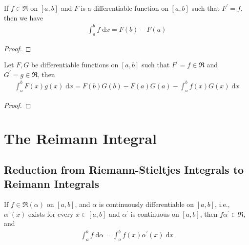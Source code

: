 \documentclass[thmcnt=section, 12pt]{elegantbook}
\begin{document}

\begin{theorem} \label{thm:1}
    If $ f \in \mathfrak{R} $ on $[a, b]$ and $F$ is a differentiable function on $[a, b]$ such that $F^\prime = f$, then we have
    \begin{align*}
        \int_a^b f \; \mathrm{d} x = F(b) - F(a)
    \end{align*}
\end{theorem}

\begin{proof}
\end{proof}


\begin{theorem} \label{thm:2}
    Let $F, G$ be differentiable functions on $[a, b]$ such that $F^\prime = f \in \mathfrak{R}$ and $G^\prime = g \in \mathfrak{R}$, then 
    \begin{align*}
        \int_a^b F(x)g(x) \; \mathrm{d} x = F(b)G(b) - F(a)G(a) - \int_a^b f(x)G(x) \; \mathrm{d} x
    \end{align*}
\end{theorem}

\begin{proof}
\end{proof}



\chapter{The Reimann Integral}


\section{Reduction from Riemann-Stieltjes Integrals to Reimann Integrals}


\begin{theorem}
    If $f \in \mathfrak{R}(\alpha)$ on $[a, b]$, and $\alpha$ is continuously differentiable on $[a, b]$, i.e., $\alpha^\prime(x)$ exists for every $x \in [a, b]$ and $\alpha^\prime$ is continuous on $[a, b]$, then $f \alpha^\prime \in \mathfrak{R}$, and 
    \begin{align}
        \int_a^b f \; \mathrm{d}\alpha
        = \int_a^b f(x) \alpha^\prime(x) \; \mathrm{d}x
        \label{eq:85}
    \end{align}
\end{theorem}
\end{document}
